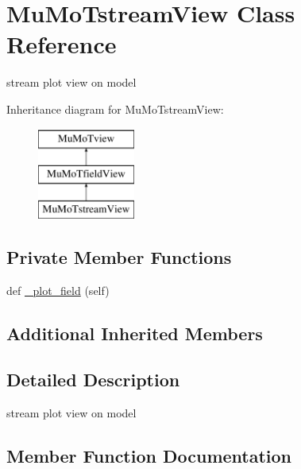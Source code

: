 \hypertarget{class_mu_mo_t_1_1_mu_mo_tstream_view}{}\section{Mu\+Mo\+Tstream\+View Class Reference}
\label{class_mu_mo_t_1_1_mu_mo_tstream_view}


stream plot view on model  


Inheritance diagram for Mu\+Mo\+Tstream\+View\+:\begin{figure}[H]
\begin{center}
\leavevmode
\includegraphics[height=3.000000cm]{class_mu_mo_t_1_1_mu_mo_tstream_view}
\end{center}
\end{figure}
\subsection*{Private Member Functions}
\begin{DoxyCompactItemize}
\item 
def \hyperlink{class_mu_mo_t_1_1_mu_mo_tstream_view_a50d59419298116f738a98c864afb9d89}{\+\_\+plot\+\_\+field} (self)
\end{DoxyCompactItemize}
\subsection*{Additional Inherited Members}


\subsection{Detailed Description}
stream plot view on model 

\subsection{Member Function Documentation}
\mbox{\label{class_mu_mo_t_1_1_mu_mo_tstream_view_a50d59419298116f738a98c864afb9d89}} 
